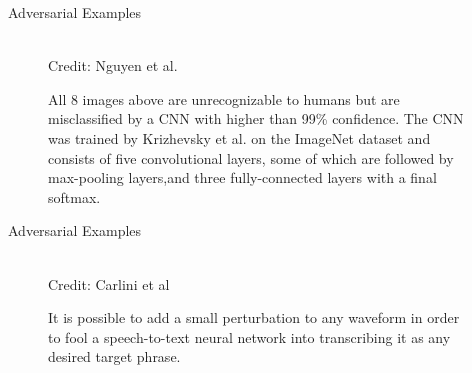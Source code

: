 \documentclass[11pt,compress,t,notes=noshow]{beamer}
\begin{document}
\begin{frame} {Adversarial Examples}
  \begin{figure}
    \centering
       \captionsetup{font=footnotesize,labelfont=footnotesize, labelfont = bf}
      \tiny{\\Credit: Nguyen et al.}
      \caption{\footnotesize All 8 images above are unrecognizable to humans but are misclassified by a CNN with higher than 99\% confidence.  The CNN was trained by Krizhevsky et al. on the ImageNet dataset and consists of five convolutional layers, some of which are followed by max-pooling layers,and three fully-connected layers with a final softmax.}
  \end{figure}
\end{frame}

\begin{frame} {Adversarial Examples}
  \begin{figure}
    \centering
      \tiny{\\Credit: Carlini et al}
      \caption{\footnotesize  It is possible to add a small perturbation to any waveform in order to fool a speech-to-text neural network into transcribing it as any desired target phrase. 
      }
  \end{figure}
\end{frame}
\end{document}

